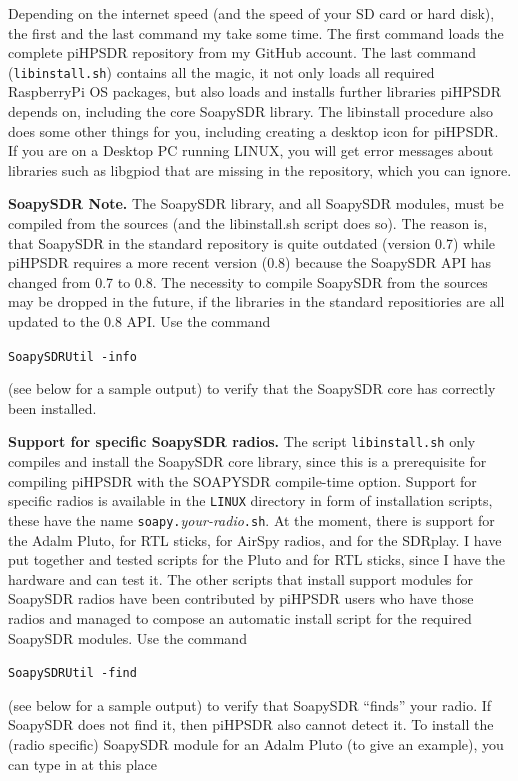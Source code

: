 \documentclass[12pt]{book}
\def\grtt#1{\texttt{\color{magenta}#1}}
\def\pH{pi\-HPSDR\xspace}
\begin{document}
Depending on the internet speed (and the speed of your SD card or hard disk), the first and the
last command my take some time. The first command loads the complete \pH repository from
my GitHub account. The last command (\texttt{libinstall.sh}) contains all the magic,
it not only loads all required RaspberryPi OS packages,
but also loads and installs further libraries \pH depends on,
including the core SoapySDR library. The libinstall procedure also does some other things for you, including creating a desktop icon
for \pH. If you are on a Desktop PC running LINUX, you will get error messages about
libraries such as libgpiod that are missing in the repository, which you can ignore.

\textbf{\color{red}SoapySDR Note.} The SoapySDR library, and all SoapySDR modules, must be compiled from the sources
(and the libinstall.sh script does so). The reason is, that SoapySDR in the standard repository
is quite outdated (version 0.7) while \pH requires a more recent version (0.8) because the
SoapySDR API has changed from 0.7 to 0.8. The necessity to compile SoapySDR from the sources
may be dropped in the future, if the libraries in the standard repositiories are all updated
to the 0.8 API. Use the command

\grtt{SoapySDRUtil -info}

(see below for a sample output) to
verify that the SoapySDR core has correctly been installed.

\textbf{\color{red}Support for specific SoapySDR radios.} The script \texttt{libinstall.sh} only compiles
and install the SoapySDR core library, since this is a prerequisite for compiling \pH with
the SOAPYSDR compile-time option. Support for specific radios is available in the \texttt{LINUX}
directory in form of installation scripts, these have the name \texttt{soapy.}\textit{your-radio}\texttt{.sh}.
At the moment, there is support for the Adalm Pluto, for RTL sticks, for AirSpy radios, and
for the SDRplay. I have put together and tested scripts for the Pluto and for RTL sticks,
since I have the hardware and can test it. The other scripts that install support modules
for SoapySDR radios have been contributed by \pH users who have those radios and managed
to compose an automatic install script for the required SoapySDR modules. Use the command

\grtt{SoapySDRUtil -find}

(see below for a sample output) to verify that SoapySDR
``finds'' your radio. If SoapySDR does not find it, then \pH also cannot detect it.
To install the (radio specific) SoapySDR module for an Adalm Pluto (to give an example),
 you can type in at this place
\end{document}

